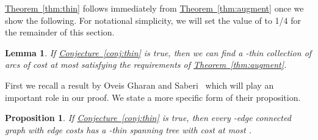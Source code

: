 \documentclass[11pt]{article}
\newcommand{\lref}[2][]{\hyperref[#2]{#1~\ref*{#2}}}
\newtheorem{proposition}[theorem]{Proposition}
\newtheorem{lemma}[theorem]{Lemma}
\theoremstyle{definition}
\begin{document}
\lref[Theorem]{thm:thin} follows immediately from \lref[Theorem]{thm:augment} once we show the following. For notational simplicity, we will set the value of  to 1/4 for the remainder of this section.

\begin{lemma}\label{lem:thin}
If \lref[Conjecture]{conj:thin} is true, then we can find a -thin collection of arcs  of cost at most  satisfying the
requirements of \lref[Theorem]{thm:augment}.
\end{lemma}

First we recall a result by Oveis Gharan and Saberi~\cite{GS11} which will play an important role in our proof. We state a more specific
form of their proposition.
\begin{proposition}{\cite{GS11}}\label{prop:thintree}
If \lref[Conjecture]{conj:thin} is true, then every -edge connected graph  with edge costs  has a
-thin spanning tree with cost at most .
\end{proposition}
\end{document}

